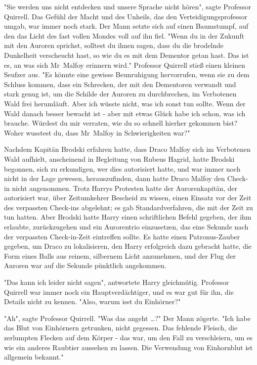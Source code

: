 {"Sie werden uns nicht entdecken und unsere Sprache nicht hören", sagte Professor Quirrell. Das Gefühl der Macht und des Unheils, das den Verteidigungsprofessor umgab, war immer noch stark. Der Mann setzte sich auf einen Baumstumpf, auf den das Licht des fast vollen Mondes voll auf ihn fiel. "Wenn du in der Zukunft mit den Auroren sprichst, solltest du ihnen sagen, dass du die brodelnde Dunkelheit verscheucht hast, so wie du es mit dem Dementor getan hast. Das ist es, an was sich Mr~Malfoy erinnern wird." Professor Quirrell stieß einen kleinen Seufzer aus. "Es könnte eine gewisse Beunruhigung hervorrufen, wenn sie zu dem Schluss kommen, dass ein Schrecken, der mit den Dementoren verwandt und stark genug ist, um die Schilde der Auroren zu durchbrechen, im Verbotenen Wald frei herumläuft. Aber ich wüsste nicht, was ich sonst tun sollte. Wenn der Wald danach besser bewacht ist - aber mit etwas Glück habe ich schon, was ich brauche. Würdest du mir verraten, wie du so schnell hierher gekommen bist? Woher wusstest du, dass Mr~Malfoy in Schwierigkeiten war?"

Nachdem Kapitän Brodski erfahren hatte, dass Draco Malfoy sich im Verbotenen Wald aufhielt, anscheinend in Begleitung von Rubeus Hagrid, hatte Brodski begonnen, sich zu erkundigen, wer dies autorisiert hatte, und war immer noch nicht in der Lage gewesen, herauszufinden, dann hatte Draco Malfoy den Check-in nicht angenommen. Trotz Harrys Protesten hatte der Aurorenkapitän, der autorisiert war, über Zeitumkehrer Bescheid zu wissen, einen Einsatz vor der Zeit des verpassten Check-ins abgelehnt; es gab Standardverfahren, die mit der Zeit zu tun hatten. Aber Brodski hatte Harry einen schriftlichen Befehl gegeben, der ihm erlaubte, zurückzugehen und ein Aurorentrio einzusetzen, das eine Sekunde nach der verpassten Check-in-Zeit eintreffen sollte. Es hatte einen Patronus-Zauber gegeben, um Draco zu lokalisieren, den Harry erfolgreich dazu gebracht hatte, die Form eines Balls aus reinem, silbernem Licht anzunehmen, und der Flug der Auroren war auf die Sekunde pünktlich angekommen.

"Das kann ich leider nicht sagen", antwortete Harry gleichmütig. Professor Quirrell war immer noch ein Hauptverdächtiger, und es war gut für ihn, die Details nicht zu kennen. "Also, warum isst du Einhörner?"

"Ah", sagte Professor Quirrell. "Was das angeht …?" Der Mann zögerte. "Ich habe das Blut von Einhörnern getrunken, nicht gegessen. Das fehlende Fleisch, die zerlumpten Flecken auf dem Körper - das war, um den Fall zu verschleiern, um es wie ein anderes Raubtier aussehen zu lassen. Die Verwendung von Einhornblut ist allgemein bekannt."

}
